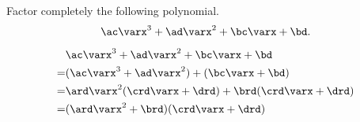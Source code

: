 






\pgfmathtruncatemacro{\ac}{\ard*\crd}
\pgfmathtruncatemacro{\ad}{\ard*\drd}
\pgfmathtruncatemacro{\bc}{\brd*\crd}
\pgfmathtruncatemacro{\bd}{\brd*\drd}



\edef\varxy{\varx}

\edef\varab{\vara}

\edef\varpq{\varb}

\edef\varmn{\vary}








Factor completely the following polynomial.
\[\ac\varx^3  +{\ad}\varx^2 + {\bc}\varx +\bd.\]

\begin{solution}
\[\begin{split}
&\ac\varx^3  +{\ad}\varx^2 + {\bc}\varx +\bd\\
=&(\ac\varx^3 +{\ad}\varx^2) + ({\bc}\varx+\bd)\\
=&\ard\varx^2(\crd\varx + {\drd})+ {\brd}(\crd\varx+{\drd})\\
=&(\ard\varx^2 + {\brd})(\crd\varx + {\drd})
\end{split}
\]
\end{solution}